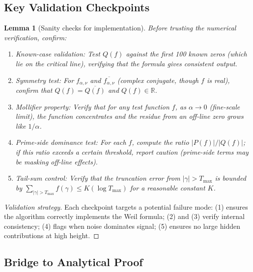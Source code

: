 \documentclass[11pt]{article}
\theoremstyle{plain}
\newtheorem{lemma}[theorem]{Lemma}
\theoremstyle{definition}
\theoremstyle{remark}
\begin{document}
\subsection{Key Validation Checkpoints}

\begin{lemma}[Sanity checks for implementation]
Before trusting the numerical verification, confirm:
\begin{enumerate}
  \item \emph{Known-case validation:} Test $Q(f)$ against the first 100 known zeros
  (which lie on the critical line), verifying that the formula gives consistent output.

  \item \emph{Symmetry test:} For $f_{\alpha,\nu}$ and $\overline{f_{\alpha,\nu}}$ (complex conjugate, though $f$ is real),
  confirm that $Q(f)=\overline{Q(f)}$ and $Q(f)\in\mathbb{R}$.

  \item \emph{Mollifier property:} Verify that for any test function $f$, as $\alpha\to 0$ (fine-scale limit),
  the function concentrates and the residue from an off-line zero grows like $1/\alpha$.

  \item \emph{Prime-side dominance test:} For each $f$, compute the ratio $|P(f)|/|Q(f)|$;
  if this ratio exceeds a certain threshold, report caution (prime-side terms may be masking off-line effects).

  \item \emph{Tail-sum control:} Verify that the truncation error from $|\gamma|>T_{\max}$ is bounded by
  $\sum_{|\gamma|>T_{\max}} f(\gamma) \le K(\log T_{\max})$ for a reasonable constant $K$.
\end{enumerate}
\end{lemma}

\begin{proof}[Validation strategy]
Each checkpoint targets a potential failure mode:
(1) ensures the algorithm correctly implements the Weil formula;
(2) and (3) verify internal consistency;
(4) flags when noise dominates signal;
(5) ensures no large hidden contributions at high height.
\end{proof}

\subsection{Bridge to Analytical Proof}
\end{document}
